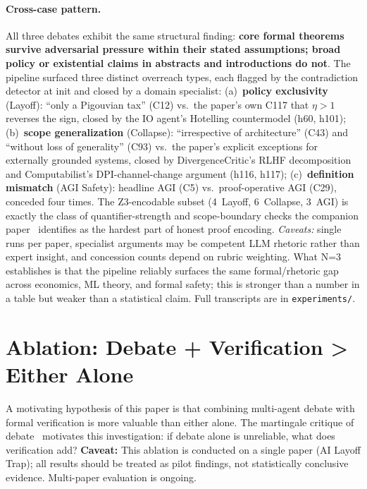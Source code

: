 \documentclass[11pt]{article}
\begin{document}
\paragraph{Cross-case pattern.}
\label{sec:crosscase}
All three debates exhibit the same structural finding: \textbf{core formal theorems survive adversarial pressure within their stated assumptions; broad policy or existential claims in abstracts and introductions do not}. The pipeline surfaced three distinct overreach types, each flagged by the contradiction detector at init and closed by a domain specialist: (a)~\textbf{policy exclusivity} (Layoff): ``only a Pigouvian tax'' (C12) vs.\ the paper's own C117 that $\eta > 1$ reverses the sign, closed by the IO agent's Hotelling countermodel (h60, h101); (b)~\textbf{scope generalization} (Collapse): ``irrespective of architecture'' (C43) and ``without loss of generality'' (C93) vs.\ the paper's explicit exceptions for externally grounded systems, closed by DivergenceCritic's RLHF decomposition and Computabilist's DPI-channel-change argument (h116, h117); (c)~\textbf{definition mismatch} (AGI Safety): headline AGI (C5) vs.\ proof-operative AGI (C29), conceded four times. The Z3-encodable subset (4~Layoff, 6~Collapse, 3~AGI) is exactly the class of quantifier-strength and scope-boundary checks the companion paper~\cite{arbiterpaperA} identifies as the hardest part of honest proof encoding. \emph{Caveats:} single runs per paper, specialist arguments may be competent LLM rhetoric rather than expert insight, and concession counts depend on rubric weighting. What N=3 establishes is that the pipeline reliably surfaces the same formal/rhetoric gap across economics, ML theory, and formal safety; this is stronger than a number in a table but weaker than a statistical claim. Full transcripts are in \texttt{experiments/}.

\section{Ablation: Debate + Verification > Either Alone}
\label{sec:ablation}

A motivating hypothesis of this paper is that combining multi-agent debate with formal verification is more valuable than either alone.
The martingale critique of debate~\cite{debateskepticism2025} motivates this investigation: if debate alone is unreliable, what does verification add?
\textbf{Caveat:} This ablation is conducted on a single paper (AI Layoff Trap); all results should be treated as pilot findings, not statistically conclusive evidence. Multi-paper evaluation is ongoing.
\end{document}
